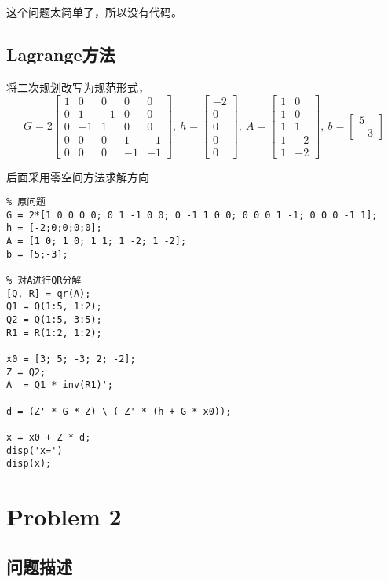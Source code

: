 \documentclass[11pt,a4paper]{article}
\begin{document}
这个问题太简单了，所以没有代码。
\subsection{Lagrange方法}

将二次规划改写为规范形式，
\[G=2\begin{bmatrix}
1 & 0 & 0 & 0 & 0\\
0 & 1 & -1 & 0 & 0\\
0 & -1 & 1 & 0 & 0\\
0 & 0 & 0 & 1 & -1\\
0 & 0 & 0 & -1 & -1
\end{bmatrix},~
h=\begin{bmatrix}
-2\\0\\0\\0\\0
\end{bmatrix},~
A=\begin{bmatrix}
1 & 0\\
1 & 0\\
1 & 1\\
1 & -2\\
1 &-2
\end{bmatrix},~
b=\begin{bmatrix}
5\\-3
\end{bmatrix}\]

后面采用零空间方法求解方向

\scriptsize
\begin{lstlisting}
% 原问题
G = 2*[1 0 0 0 0; 0 1 -1 0 0; 0 -1 1 0 0; 0 0 0 1 -1; 0 0 0 -1 1];
h = [-2;0;0;0;0];
A = [1 0; 1 0; 1 1; 1 -2; 1 -2];
b = [5;-3];

% 对A进行QR分解
[Q, R] = qr(A);
Q1 = Q(1:5, 1:2);
Q2 = Q(1:5, 3:5);
R1 = R(1:2, 1:2);

x0 = [3; 5; -3; 2; -2];
Z = Q2;
A_ = Q1 * inv(R1)';

d = (Z' * G * Z) \ (-Z' * (h + G * x0));

x = x0 + Z * d;
disp('x=')
disp(x);
\end{lstlisting}
\normalsize

\section{Problem 2}

\subsection{问题描述}
\end{document}
